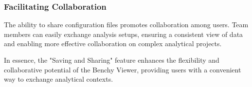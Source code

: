 \subsubsection{Facilitating Collaboration}
The ability to share configuration files promotes collaboration among users. Team members can easily exchange analysis setups, ensuring a consistent view of data and enabling more effective collaboration on complex analytical projects.

In essence, the "Saving and Sharing" feature enhances the flexibility and collaborative potential of the Benchy Viewer, providing users with a convenient way to exchange analytical contexts.
